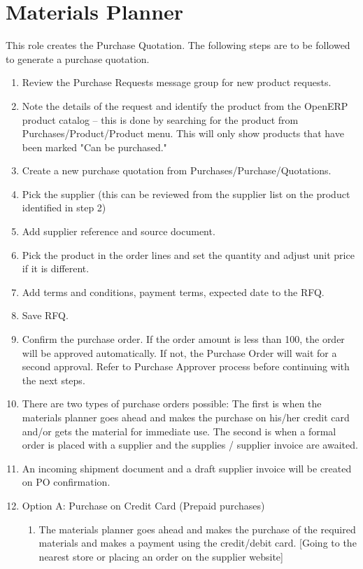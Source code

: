 \section{Materials Planner}

This role creates the Purchase Quotation. The following steps are to be followed to generate a purchase quotation.

\begin{enumerate}
\item Review the Purchase Requests message group for new product requests. 
\item Note the details of the request and identify the product from the OpenERP product catalog -- this is done by searching for the product from Purchases/Product/Product menu. This will only show products that have been marked "Can be purchased."
\item Create a new purchase quotation from Purchases/Purchase/Quotations.
\item Pick the supplier (this can be reviewed from the supplier list on the product identified in step 2)
\item Add supplier reference and source document.
\item Pick the product in the order lines and set the quantity and adjust unit price if it is different. 
\item Add terms and conditions, payment terms, expected date to the RFQ.
\item Save RFQ.
\item Confirm the purchase order. If the order amount is less than 100, the order will be approved automatically. If not, the Purchase Order will wait for a second approval. Refer to Purchase Approver process before continuing with the next steps.
\item There are two types of purchase orders possible: The first is when the materials planner goes ahead and makes the purchase on his/her credit card and/or gets the material for immediate use. The second is when a formal order is placed with a supplier and the supplies / supplier invoice are awaited.
\item An incoming shipment document and a draft supplier invoice will be created on PO confirmation.
\item Option A: Purchase on Credit Card (Prepaid purchases)
  \begin{enumerate}
  \item The materials planner goes ahead and makes the purchase of the required materials and makes a payment using the credit/debit card. [Going to the nearest store or placing an order on the supplier website]

\end{enumerate}
\end{enumerate}

